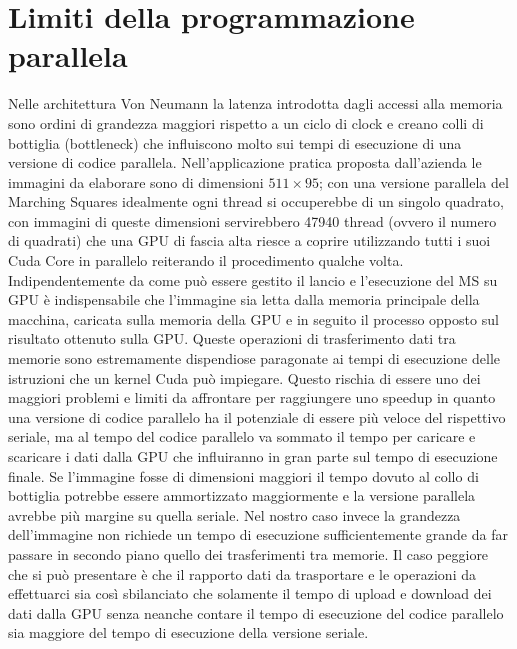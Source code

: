 \documentclass[12pt,a4paper]{report}
\begin{document}
\section{Limiti della programmazione parallela}
Nelle architettura Von Neumann la latenza introdotta dagli accessi alla memoria sono ordini di grandezza maggiori rispetto a un ciclo di clock e creano colli di bottiglia (bottleneck) che influiscono molto sui tempi di esecuzione di una versione di codice parallela.
Nell'applicazione pratica proposta dall'azienda le immagini da elaborare sono di dimensioni $511\times 95$; con una versione parallela del Marching Squares idealmente ogni thread si occuperebbe di un singolo quadrato, con immagini di queste dimensioni servirebbero 47940 thread (ovvero il numero di quadrati) che una GPU di fascia alta riesce a coprire utilizzando tutti i suoi Cuda Core in parallelo reiterando il procedimento qualche volta. \newline
Indipendentemente da come può essere gestito il lancio e l'esecuzione del MS su GPU è indispensabile che l'immagine sia letta dalla memoria principale della macchina, caricata sulla memoria della GPU e in seguito il processo opposto sul risultato ottenuto sulla GPU.
Queste operazioni di trasferimento dati tra memorie sono estremamente dispendiose paragonate ai tempi di esecuzione delle istruzioni che un kernel Cuda può impiegare.
Questo rischia di essere uno dei maggiori problemi e limiti da affrontare per raggiungere uno speedup in quanto una versione di codice parallelo ha il potenziale di essere più veloce del rispettivo seriale, ma al tempo del codice parallelo va sommato il tempo per caricare e scaricare i dati dalla GPU che influiranno in gran parte sul tempo di esecuzione finale. \newline
Se l'immagine fosse di dimensioni maggiori il tempo dovuto al collo di bottiglia potrebbe essere ammortizzato maggiormente e la versione parallela avrebbe più margine su quella seriale. Nel nostro caso invece la grandezza dell'immagine non richiede un tempo di esecuzione sufficientemente grande da far passare in secondo piano quello dei trasferimenti tra memorie. \newline
Il caso peggiore che si può presentare è che il rapporto dati da trasportare e le operazioni da effettuarci sia così sbilanciato che solamente il tempo di upload e download dei dati dalla GPU senza neanche contare il tempo di esecuzione del codice parallelo sia maggiore del tempo di esecuzione della versione seriale.
\newpage
\end{document}
